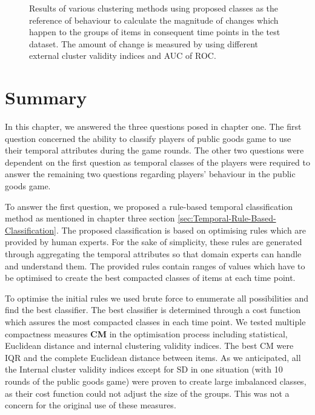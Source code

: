 \begin{figure}[!h]
{\begin{minipage}{\dimexpr \textwidth-2\fboxsep-2\fboxrule}
                \end{minipage}}
                \caption{Results of various clustering methods using proposed classes as the reference of behaviour to calculate the magnitude of changes which happen to the groups of items in consequent time points in the test dataset. The amount of change  is measured by using different external cluster validity indices and AUC of ROC.}
                \label{fig:test_ChangeMeasuers_Class_PGG27}
            \end{figure}



\section{Summary} 

In this chapter, we answered the three questions posed in chapter one. The first question concerned the ability to classify players of public goods game to use their temporal attributes during the game rounds. The other two questions were dependent on the first question as temporal classes of the players were required to answer the remaining two questions regarding players' behaviour in the public goods game.

To answer the first question, we proposed a rule-based temporal classification method as mentioned in chapter three section  \ref{sec:Temporal-Rule-Based-Classification}. The proposed classification is based on optimising rules which are provided by human experts. For the sake of simplicity, these rules are generated through aggregating the temporal attributes so that domain experts can handle and understand them. The provided rules contain ranges of values which have to be optimised to create the best compacted classes of items at each time point.

To optimise the initial rules we used brute force to enumerate all possibilities and find the best classifier. The best classifier is determined through a cost function which assures the most compacted classes in each time point. We tested multiple compactness measures \textbf{CM} in the optimisation process including statistical, Euclidean distance and internal clustering validity indices. The best CM were IQR and the complete Euclidean distance between items. As we anticipated, all the  Internal cluster validity indices except for SD in one situation (with 10 rounds of the public goods game) were proven to create large imbalanced classes, as their cost function could not adjust the size of the groups. This was not a concern for the original use of these measures.

